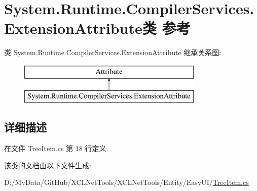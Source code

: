 \hypertarget{class_system_1_1_runtime_1_1_compiler_services_1_1_extension_attribute}{}\section{System.\+Runtime.\+Compiler\+Services.\+Extension\+Attribute类 参考}
\label{class_system_1_1_runtime_1_1_compiler_services_1_1_extension_attribute}
类 System.\+Runtime.\+Compiler\+Services.\+Extension\+Attribute 继承关系图\+:\begin{figure}[H]
\begin{center}
\leavevmode
\includegraphics[height=2.000000cm]{class_system_1_1_runtime_1_1_compiler_services_1_1_extension_attribute}
\end{center}
\end{figure}


\subsection{详细描述}


在文件 Tree\+Item.\+cs 第 18 行定义.



该类的文档由以下文件生成\+:\begin{DoxyCompactItemize}
\item 
D\+:/\+My\+Data/\+Git\+Hub/\+X\+C\+L\+Net\+Tools/\+X\+C\+L\+Net\+Tools/\+Entity/\+Easy\+U\+I/\hyperlink{_tree_item_8cs}{Tree\+Item.\+cs}\end{DoxyCompactItemize}

